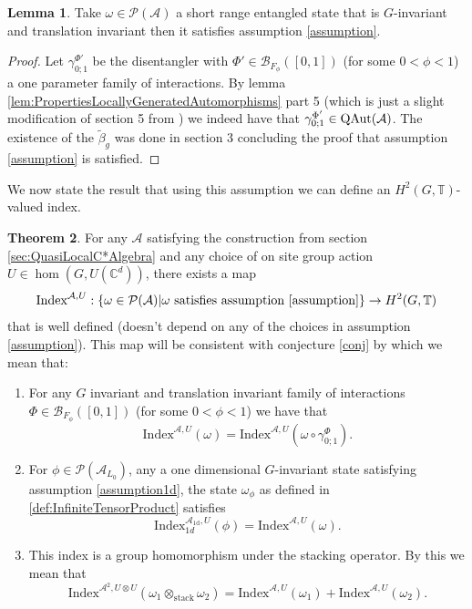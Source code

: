 \documentclass[12pt,a4paper,twoside]{article}
\let\originalleft\left
\let\originalright\right
\renewcommand{\left}{\mathopen{}\mathclose\bgroup\originalleft}
\renewcommand{\right}{\aftergroup\egroup\originalright}
\newcommand{\BB}{\mathcal B}
\newcommand{\PP}{\mathcal P}
\newcommand{\CC}{\mathbb C}
\newcommand{\TT}{\mathbb T}
\renewcommand{\AA}{\mathcal A}
\newcommand{\QAut}[1]{\textrm{QAut}\left(#1\right)}
\theoremstyle{definition}
\newtheorem{theorem}{Theorem}[section]
\newtheorem{lemma}[theorem]{Lemma}
\numberwithin{equation}{section}
\begin{document}
\begin{lemma}\label{lem:SRE_Implies_QDisentanglable_OneTranslation}
	Take $\omega\in\PP(\AA)$ a short range entangled state that is $G$-invariant and translation invariant then it satisfies assumption \ref{assumption}.
\end{lemma}
\begin{proof}
	 Let $\gamma^{\Phi'}_{0;1}$ be the disentangler with $\Phi'\in\BB_{F_\phi}([0,1])$ (for some $0<\phi<1$) a one parameter family of interactions. By lemma \ref{lem:PropertiesLocallyGeneratedAutomorphisms} part 5 (which is just a slight modification of section 5 from \cite{ogata2021h3gmathbb}) we indeed have that $\gamma^{\Phi'}_{0;1}\in\QAut{\AA}$. The existence of the $\tilde{\beta}_g$ was done in \cite{ogata2021h3gmathbb} section 3 concluding the proof that assumption \ref{assumption} is satisfied.
\end{proof}
We now state the result that using this assumption we can define an $H^2(G,\TT)$-valued index.
\begin{theorem}\label{thrm:ExistenceFirstIndex}
	For any $\AA$ satisfying the construction from section \ref{sec:QuasiLocalC*Algebra} and any choice of on site group action $U\in\hom(G,U(\CC^d))$, there exists a map
	\begin{equation}
		\textrm{Index}^{\AA,U}:\{\omega\in\PP(\AA)|\omega\text{ satisfies assumption \ref{assumption}}\}\rightarrow H^2(G,\TT)
	\end{equation}
	that is well defined (doesn't depend on any of the choices in assumption \ref{assumption}). This map will be consistent with conjecture \ref{conj} by which we mean that:
	\begin{enumerate}
		\item For any $G$ invariant and translation invariant family of interactions $\Phi\in\BB_{F_{\phi}}([0,1])$ (for some $0<\phi<1$) we have that
		\begin{equation}
			\textrm{Index}^{\AA,U}(\omega)=\textrm{Index}^{\AA,U}(\omega\circ\gamma^{\Phi}_{0;1}).
		\end{equation}
		\item For $\phi\in\PP(\AA_{L_0})$, any a one dimensional $G$-invariant state satisfying assumption \ref{assumption1d}, the state $\omega_\phi$ as defined in \ref{def:InfiniteTensorProduct} satisfies
		\begin{equation}
			\textrm{Index}^{\AA_{\text{1d}},U}_{1d}(\phi)=\textrm{Index}^{\AA,U}(\omega).
		\end{equation}
		\item This index is a group homomorphism under the stacking operator. By this we mean that
		\begin{equation}
			\textrm{Index}^{\AA^2,U\otimes U}(\omega_1\otimes_{\text{stack}}\omega_2)=\textrm{Index}^{\AA,U}(\omega_1)+\textrm{Index}^{\AA,U}(\omega_2).
		\end{equation}
	\end{enumerate}
\end{theorem}
\end{document}
